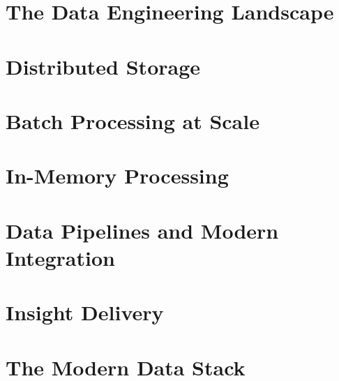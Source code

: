 \documentclass[11pt,b5paper,twoside,openright]{book}
\begin{document}
\tableofcontents

\mainmatter

\part{The Data Engineering Landscape}



\part{Distributed Storage}


\part{Batch Processing at Scale}



\part{In-Memory Processing}



\part{Data Pipelines and Modern Integration}


\part{Insight Delivery}



\part{The Modern Data Stack}


\backmatter

\printbibliography[
  heading=bibintoc,
  title={References}
]

\printindex
\end{document}
